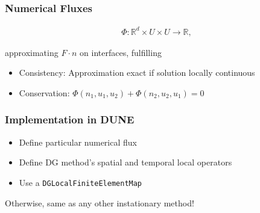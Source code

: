 \documentclass[aspectratio=169,11pt]{beamer}
\theoremstyle{definition}
\begin{document}
\begin{frame}
\frametitle{Numerical Fluxes}


\begin{align*}
\Phi :  \mathbb{R}^d \times U \times U \rightarrow \mathbb{R},
\end{align*}

approximating $F \cdot n$ on interfaces, fulfilling

\begin{itemize}
  \item Consistency: Approximation exact if solution locally continuous
  \item Conservation: $\Phi(n_1,u_1,u_2) + \Phi(n_2, u_2, u_1) = 0$

\end{itemize}
\end{frame}


\begin{frame}
\frametitle{Implementation in DUNE}

\begin{itemize}
  \item Define particular numerical flux
  \item Define DG method's spatial and temporal local operators
  \item Use a \texttt{DGLocalFiniteElementMap}
\end{itemize}
Otherwise, same as any other instationary method!
\end{frame}
\end{document}
